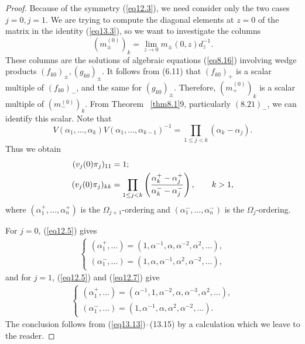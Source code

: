 \documentclass{surv-l}
\theoremstyle{plain}
\theoremstyle{definition}
\numberwithin{equation}{chapter}
\begin{document}
\begin{proof}
Because of the symmetry (\ref{eq12.3}), we need consider only the two cases $j=0, j =1$. We are trying to compute the diagonal elements at $z=0$ of the matrix in the identity (\ref{eq13.3}), so we want to investigate the columns
\begin{equation*}
(m_{\pm}^{(0)})_{k}=\lim_{z\rightarrow 0}m_{\pm}(0, z)d_{z}^{-1}.
\end{equation*}
These columns are the solutions of algebraic equations (\ref{eq8.16}) involving wedge products $(f_{k0})_{\pm}, (g_{k0})_{\pm}$. It follows from (6.11) that $(f_{k0})_{+}$ is a scalar multiple of $(f_{k0})_{-}$, and the same for $(g_{k0})_{\pm}$. Therefore, $(m_{+}^{(0)})_{k}$ is a scalar multiple of $(m_{-}^{(0)})_{k}$. From Theorem ~\ref{thm8.1}9, particularly $(8.21)_{-}$, we can identify this scalar. Note that
\begin{equation*}
V(\alpha_{1}, \ldots, \alpha_{k})V(\alpha_{1},\ldots, \alpha_{k-1})^{-1}=\prod_{1\leq j<k}(\alpha_{k}-\alpha_{j}).
\end{equation*}
Thus we obtain
\begin{align}\label{eq13.13}
(v_{j}(0)\pi_{j})_{11}&=1;\\ \notag
 (v_{j}(0)\displaystyle \pi_{j})_{kk}&=\prod_{1\leq j<k}\left(\frac{\alpha_{k}^{+}-\alpha_{j}^{+}}{\alpha_{k}^{-}-\alpha_{j}^{-}}\right),\qquad k>1,
\end{align}
where $(\alpha_{1}^{+},\ldots,\alpha_{n}^{+})$ is the $\Omega_{j+1}$-ordering and $(\alpha_{1}^{-},\ldots, \alpha_{n}^{-})$ is the $\Omega_{j}$-ordering.

For $j=0$, (\ref{eq12.5}) gives
\begin{align}\label{eq13.14}
\left\{\begin{array}{l}
(\alpha_{1}^{+}, \ldots)=(1, \alpha^{-1},\alpha, \alpha^{-2}, \alpha^{2},\ldots),\\
(\alpha_{1}^{-}, \ldots)=(1, \alpha,\alpha^{-1}, \alpha^{2}, \alpha^{-2},\ldots),
\end{array}\right.
\end{align}
and for $j=1$, (\ref{eq12.5}) and (\ref{eq12.7}) give
\begin{align}\label{eq13.15}
\left\{\begin{array}{l}
(\alpha_{1}^{+},\ldots)=(\alpha^{-1}, 1, \alpha^{-2},\alpha, \alpha^{-3}, \alpha^{2},\ldots),\\
(\alpha_{1}^{-},\ldots)=(1, \alpha^{-1}, \alpha, \alpha^{2}, \alpha^{-2}, \ldots).
\end{array}\right.
\end{align}
The conclusion follows from (\ref{eq13.13})--(13.15) by a calculation which we leave to the reader.
\end{proof}
\end{document}
